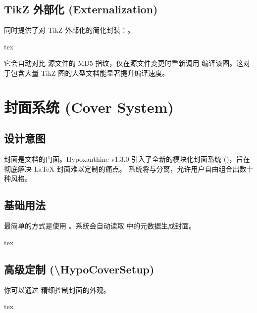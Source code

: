 \documentclass[
    outputdir=build,
    colorscheme=Tech,
    shorthand=true,
    code=true,
    fontset=lit
]{Hypo-Note}
\begin{document}
\section{TikZ 外部化 (Externalization)}

 同时提供了对 TikZ 外部化的简化封装：。

\begin{hypocode}{tex}
\end{hypocode}

它会自动对比  源文件的 MD5 指纹，仅在源文件变更时重新调用  编译该图。这对于包含大量 TikZ 图的大型文档能显著提升编译速度。

\chapter{封面系统 (Cover System)}

\section{设计意图}

封面是文档的门面。Hypoxanthine v1.3.0 引入了全新的模块化封面系统 ()，旨在彻底解决 LaTeX 封面难以定制的痛点。
系统将与分离，允许用户自由组合出数十种风格。

\section{基础用法}

最简单的方式是使用 。系统会自动读取  中的元数据生成封面。

\begin{hypocode}{tex}
\makecover
\end{hypocode}

\section{高级定制 (\textbackslash HypoCoverSetup)}

你可以通过  精细控制封面的外观。

\begin{hypocode}{tex}
\end{hypocode}
\end{document}
